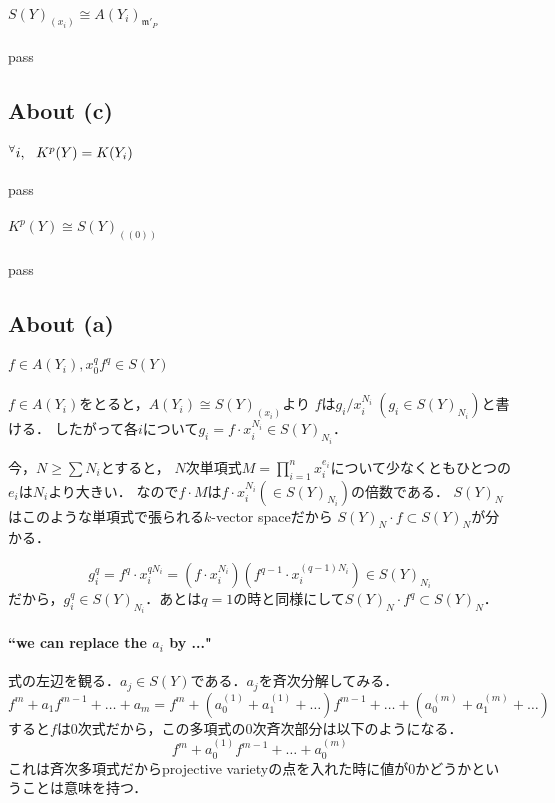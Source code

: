 \documentclass[a4paper]{jarticle}
\newcommand{\I}[1]{\mathfrak{#1}}
\begin{document}
    \paragraph{$S(Y)_{(x_i)} \cong A(Y_i)_{\I{m}'_P}$}
    pass

    \subsection{About (c)}
    \paragraph{${}^{\forall} i,~~ K^p(Y)=K(Y_i)$}
    pass

    \paragraph{$K^p(Y) \cong S(Y)_{((0))}$}
    pass

    \subsection{About (a)}
    \paragraph{$f \in A(Y_i), x_0^q f^q \in S(Y)$}
    $f \in A(Y_i)$をとると，$A(Y_i) \cong S(Y)_{(x_i)}$より
    $f$は$g_i/x_i^{N_i}~(g_i \in S(Y)_{N_i})$と書ける．
    したがって各$i$について$g_i=f \cdot x_i^{N_i} \in S(Y)_{N_i}$．

    今，$N \geq \sum{N_i}$とすると，
    $N$次単項式$M=\prod_{i=1}^{n}{x_i^{e_i}}$について少なくともひとつの$e_i$は$N_i$より大きい．
    なので$f \cdot M$は$f \cdot x_i^{N_i} (\in S(Y)_{N_i})$の倍数である．
    $S(Y)_N$はこのような単項式で張られる$k$-vector spaceだから
    $S(Y)_N \cdot f \subset S(Y)_N$が分かる．

    \[ g_i^q=f^q \cdot x_i^{qN_i}=(f \cdot x_i^{N_i})(f^{q-1} \cdot x_i^{(q-1)N_i}) \in S(Y)_{N_i} \]
    だから，$g_i^q \in S(Y)_{N_i}$．あとは$q=1$の時と同様にして$S(Y)_N \cdot f^q \subset S(Y)_N$．

    \paragraph{``we can replace the $a_i$ by ..."}
    式の左辺を観る．$a_j \in S(Y)$である．$a_j$を斉次分解してみる．
    \[ f^m+a_1 f^{m-1}+\dots+a_m=f^m+(a^{(1)}_0+a^{(1)}_1+\dots) f^{m-1}+\dots+(a^{(m)}_0+a^{(m)}_1+\dots) \]
    すると$f$は0次式だから，この多項式の0次斉次部分は以下のようになる．
    \[ f^m+a^{(1)}_0 f^{m-1}+\dots+a^{(m)}_0 \]
    これは斉次多項式だからprojective varietyの点を入れた時に値が0かどうかということは意味を持つ．
\end{document}
